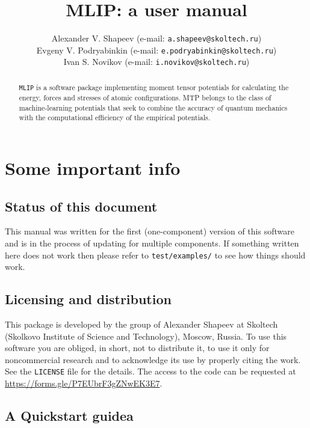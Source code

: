 \documentclass[12pt]{article}
\author{Alexander V. Shapeev (e-mail: \texttt{a.shapeev@skoltech.ru})
\\
Evgeny V. Podryabinkin (e-mail: \texttt{e.podryabinkin@skoltech.ru})
\\
Ivan S. Novikov (e-mail: \texttt{i.novikov@skoltech.ru})
}
\title{MLIP: a user %
manual}
\renewcommand{\_}{\char`_}
\begin{document}
\sloppy

\maketitle

\begin{abstract}
	\texttt{MLIP} is a software package implementing moment tensor potentials for calculating the energy, forces and stresses of atomic configurations.
	MTP belongs to the class of machine-learning potentials that seek to combine the accuracy of quantum mechanics with the computational efficiency of the empirical potentials.
\end{abstract}


\tableofcontents


\section{Some important info}
\subsection{Status of this document}	
This manual was written for the first (one-component) version of this software and is in the process of updating for multiple components.
If something written here does not work then please refer to \texttt{test/examples/} to see how things should work.

\subsection{Licensing and distribution}	
This package is developed by the group of Alexander Shapeev at Skoltech (Skolkovo Institute of Science and Technology), Moscow, Russia.
To use this software you are obliged, in short, not to distribute it, to use it only for noncommercial research and to acknowledge its use by properly citing the work.
See the \texttt{LICENSE} file for the details.
The access to the code can be requested at \url{https://forms.gle/P7EUbrF3gZNwEK3E7}.

\subsection{A Quickstart guidea}
\end{document}
